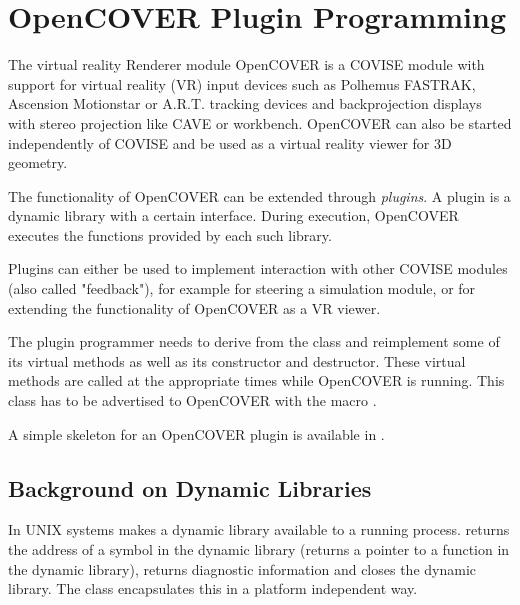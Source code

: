 
\begin{htmlonly}

\end{htmlonly}



\startdocument
\chapter{OpenCOVER Plugin Programming }
\label{COVERPlugin}




The virtual reality Renderer module OpenCOVER is a COVISE
module with support for virtual reality (VR) input devices such as Polhemus FASTRAK,
Ascension Motionstar or A.R.T. tracking devices and backprojection displays with
stereo projection like CAVE or workbench.
OpenCOVER can also be started independently of COVISE and be used as a 
virtual reality viewer for 3D geometry. 

The functionality of OpenCOVER can be extended through \emph{plugins}. 
A plugin is a 
dynamic library with a certain interface. During execution,
OpenCOVER executes the functions provided by each such library.

Plugins can either be used to implement interaction with other COVISE modules 
(also called "feedback"), for example for steering a simulation module, or for 
extending the functionality of OpenCOVER as a VR viewer.

The plugin programmer needs to derive from the class  and reimplement
some of its virtual methods as well as its constructor and destructor.
These virtual methods are called at the appropriate times while OpenCOVER is running.
This class has to be advertised to OpenCOVER with the macro .

A simple skeleton for an OpenCOVER plugin is available in
.


\section{Background on Dynamic Libraries}
\latexonly
{}
\endlatexonly

In UNIX systems  makes a dynamic library available to a running process. 
 returns the address of a symbol in the dynamic library (returns a
pointer to a function in the dynamic library),  returns diagnostic 
information and  closes the dynamic library. 
The class  encapsulates this in a platform independent way.

